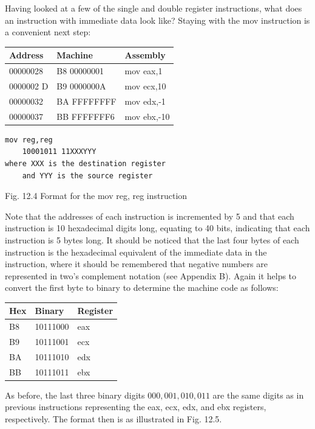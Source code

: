 \documentclass[10pt]{book}
\begin{document}
Having looked at a few of the single and double register instructions, what does an instruction with immediate data look like? Staying with the mov instruction is a convenient next step:

\begin{center}
\begin{tabular}{|l|l|l|}
\hline
Address & Machine & Assembly \\
\hline
00000028 & B8 00000001 & mov eax,1 \\
\hline
0000002 D & B9 0000000A & mov ecx,10 \\
\hline
00000032 & BA FFFFFFFF & mov edx,-1 \\
\hline
00000037 & BB FFFFFFF6 & mov ebx,-10 \\
\hline
\end{tabular}
\end{center}

\begin{verbatim}
mov reg,reg
    10001011 11XXXYYY
where XXX is the destination register
    and YYY is the source register
\end{verbatim}

Fig. 12.4 Format for the mov reg, reg instruction

Note that the addresses of each instruction is incremented by 5 and that each instruction is 10 hexadecimal digits long, equating to 40 bits, indicating that each instruction is 5 bytes long. It should be noticed that the last four bytes of each instruction is the hexadecimal equivalent of the immediate data in the instruction, where it should be remembered that negative numbers are represented in two's complement notation (see Appendix B). Again it helps to convert the first byte to binary to determine the machine code as follows:

\begin{center}
\begin{tabular}{|l|l|l|}
\hline
Hex & Binary & Register \\
\hline
B8 & 10111000 & eax \\
\hline
B9 & 10111001 & ecx \\
\hline
BA & 10111010 & edx \\
\hline
BB & 10111011 & ebx \\
\hline
\end{tabular}
\end{center}

As before, the last three binary digits $000,001,010,011$ are the same digits as in previous instructions representing the eax, ecx, edx, and ebx registers, respectively. The format then is as illustrated in Fig. 12.5.
\end{document}
